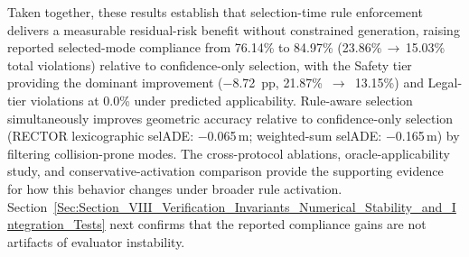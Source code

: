 Taken together, these results establish that selection-time rule enforcement delivers a measurable residual-risk benefit without constrained generation, raising reported selected-mode compliance from 76.14\% to 84.97\% (23.86\%\,$\to$\,15.03\% total violations) relative to confidence-only selection, with the Safety tier providing the dominant improvement ($-$8.72~pp, 21.87\%~$\to$~13.15\%) and Legal-tier violations at 0.0\% under predicted applicability.  Rule-aware selection simultaneously improves geometric accuracy relative to confidence-only selection (RECTOR lexicographic selADE: $-$0.065\,m; weighted-sum selADE: $-$0.165\,m) by filtering collision-prone modes.  The cross-protocol ablations, oracle-applicability study, and conservative-activation comparison provide the supporting evidence for how this behavior changes under broader rule activation.  Section~\ref{Sec:Section_VIII_Verification_Invariants_Numerical_Stability_and_Integration_Tests} next confirms that the reported compliance gains are not artifacts of evaluator instability.
